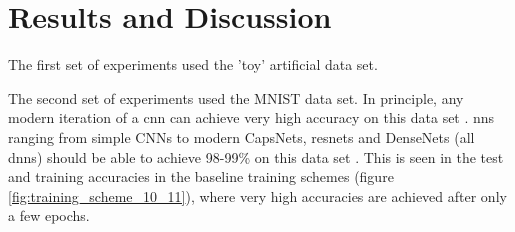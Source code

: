 \chapter{Results and Discussion}

The first set of experiments used the 'toy' artificial data set. \bigskip

The second set of experiments used the MNIST data set. In principle, any modern iteration of a \gls{cnn} can achieve very high accuracy on this data set \cite{sota_web}. \gls{nn}s ranging from simple CNNs to modern CapsNets, \gls{resnet}s and DenseNets (all \gls{dnn}s) should be able to achieve 98-99\% on this data set {\cite{mnist_sota_web}}. This is seen in the test and training accuracies in the baseline training schemes (figure \ref{fig:training_scheme_10_11}), where very high accuracies are achieved after only a few \gls{epoch}s. 
\bigskip


